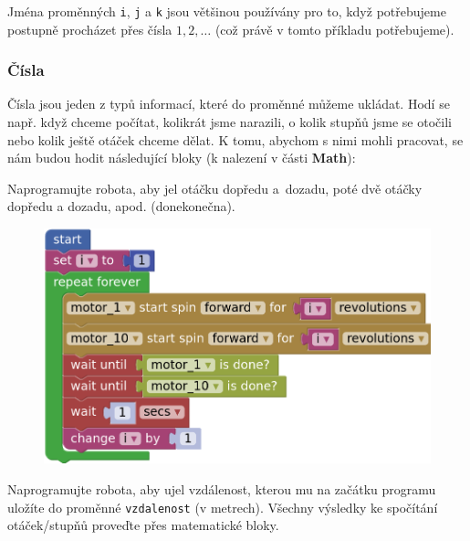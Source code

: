 \documentclass[../main.tex]{subfiles}
\begin{document}
	Jména proměnných \texttt{i}, \texttt{j} a \texttt{k} jsou většinou používány pro to, když potřebujeme postupně procházet přes čísla $1, 2, \ldots$ (což právě v tomto příkladu potřebujeme).

	\subsubsection{Čísla}\label{cha:math}
	Čísla jsou jeden z typů informací, které do proměnné můžeme ukládat. Hodí se např. když chceme počítat, kolikrát jsme narazili, o kolik stupňů jsme se otočili nebo kolik ještě otáček chceme dělat. K tomu, abychom s nimi mohli pracovat, se nám budou hodit následující bloky (k nalezení v části \textbf{Math}):
  
	\begin{itemize}
		\blockMathOperation
		\blockMathTest
		\blockMathValue
		\blockMathConstant
		\blockMathRandom
	\end{itemize}

	\begin{question}
		Naprogramujte robota, aby jel otáčku dopředu \mbox{a dozadu}, poté dvě otáčky dopředu a dozadu, apod. (donekonečna).
	\end{question}

	\begin{solution}
		\begin{figure}
			\centering
			\begin{minipage}{0.5\textwidth}
				\includegraphics[width=\linewidth]{Images/05/solsim.png}
			\end{minipage}
		\end{figure}
	\end{solution}

	\begin{question}
		Naprogramujte robota, aby ujel vzdálenost, kterou mu na začátku programu uložíte do proměnné \texttt{vzdalenost} (v metrech). Všechny výsledky ke spočítání otáček/stupňů proveďte přes matematické bloky.
	\end{question}
\end{document}
